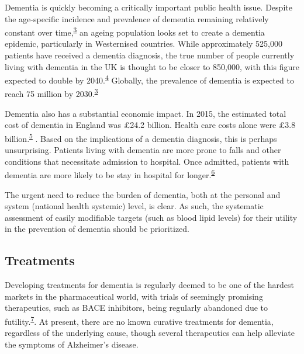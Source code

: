 \documentclass[a4paper, twoside]{templates/ociamthesis}
\begin{document}
Dementia is quickly becoming a critically important public health issue. Despite the age-specific incidence and prevalence of dementia remaining relatively constant over time,\textsuperscript{\protect\hyperlink{ref-prince2016}{3}} an ageing population looks set to create a dementia epidemic, particularly in Westernised countries. While approximately 525,000 patients have received a dementia diagnosis, the true number of people currently living with dementia in the UK is thought to be closer to 850,000, with this figure expected to double by 2040.\textsuperscript{\protect\hyperlink{ref-baker2019}{4}} Globally, the prevalence of dementia is expected to reach 75 million by 2030.\textsuperscript{\protect\hyperlink{ref-prince2016}{3}}

Dementia also has a substantial economic impact. In 2015, the estimated total cost of dementia in England was £24.2 billion. Health care costs alone were £3.8 billion.\textsuperscript{\protect\hyperlink{ref-wittenberg2019}{5}} . Based on the implications of a dementia diagnosis, this is perhaps unsurprising. Patients living with dementia are more prone to falls and other conditions that necessitate admission to hospital. Once admitted, patients with dementia are more likely to be stay in hospital for longer.\textsuperscript{\protect\hyperlink{ref-mollers2019}{6}}

The urgent need to reduce the burden of dementia, both at the personal and system (national health systemic) level, is clear. As such, the systematic assessment of easily modifiable targets (such as blood lipid levels) for their utility in the prevention of dementia should be prioritized.

\hypertarget{treatments}{%
\subsection{Treatments}\label{treatments}}

Developing treatments for dementia is regularly deemed to be one of the hardest markets in the pharmaceutical world, with trials of seemingly promising therapeutics, such as BACE inhibitors, being regularly abandoned due to futility.\textsuperscript{\protect\hyperlink{ref-cummings2020}{7}}. At present, there are no known curative treatments for dementia, regardless of the underlying cause, though several therapeutics can help alleviate the symptoms of Alzheimer's disease.
\end{document}
